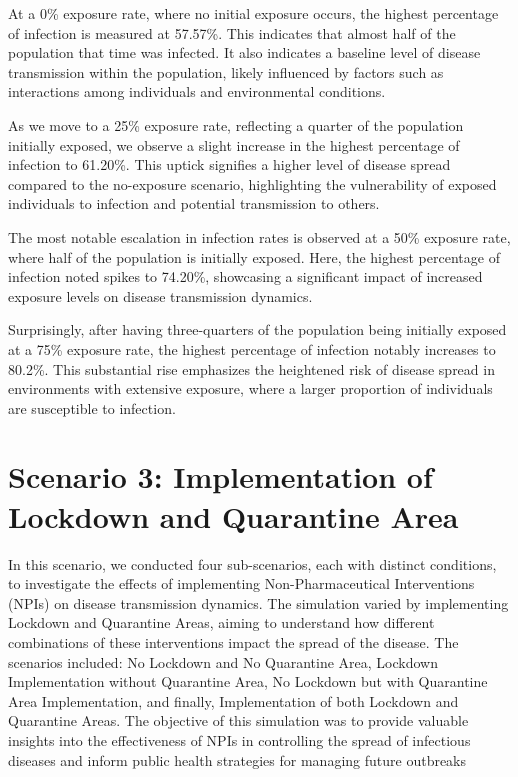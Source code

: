 At a 0\% exposure rate, where no initial exposure occurs, the  highest percentage of infection is measured at 57.57\%. This indicates that almost half of the population that time was infected. It also indicates a baseline level of disease transmission within the population, likely influenced by factors such as interactions among individuals and environmental conditions.

As we move to a 25\% exposure rate, reflecting a quarter of the population initially exposed, we observe a slight increase in the highest percentage of infection to 61.20\%. This uptick signifies a higher level of disease spread compared to the no-exposure scenario, highlighting the vulnerability of exposed individuals to infection and potential transmission to others.

The most notable escalation in infection rates is observed at a 50\% exposure rate, where half of the population is initially exposed. Here, the highest percentage of infection noted spikes to 74.20\%, showcasing a significant impact of increased exposure levels on disease transmission dynamics.

Surprisingly, after having three-quarters of the population being initially exposed at a 75\% exposure rate, the highest percentage of infection notably increases to 80.2\%. This substantial rise emphasizes the heightened risk of disease spread in environments with extensive exposure, where a larger proportion of individuals are susceptible to infection.



\section{Scenario 3: Implementation of Lockdown and Quarantine Area}
\label{S3}
In this scenario, we conducted four sub-scenarios, each with distinct conditions, to investigate the effects of implementing Non-Pharmaceutical Interventions (NPIs) on disease transmission dynamics. The simulation varied by implementing Lockdown and Quarantine Areas, aiming to understand how different combinations of these interventions impact the spread of the disease. The scenarios included: No Lockdown and No Quarantine Area, Lockdown Implementation without Quarantine Area, No Lockdown but with Quarantine Area Implementation, and finally, Implementation of both Lockdown and Quarantine Areas. The objective of this simulation was to provide valuable insights into the effectiveness of NPIs in controlling the spread of infectious diseases and inform public health strategies for managing future outbreaks 

